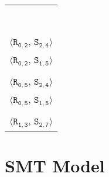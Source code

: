 \newsavebox{\boxMP}
\begin{lrbox}{\boxMP}
\normalsize
\begin{tabular}[t]{l}
\\\\\\\\\\\\\\\\\\
$\langle\mathtt{R_{0,2}}$, $\mathtt{S_{2,4}}\rangle$\\
$\langle\mathtt{R_{0,2}}$, $\mathtt{S_{1,5}}\rangle$\\
\\
$\langle\mathtt{R_{0,5}}$, $\mathtt{S_{2,4}}\rangle$\\
$\langle\mathtt{R_{0,5}}$, $\mathtt{S_{1,5}}\rangle$\\
\\
$\langle\mathtt{R_{1,3}}$, $\mathtt{S_{2,7}}\rangle$\\
\end{tabular}
\end{lrbox}




\section{SMT Model}\label{sec:smt}


